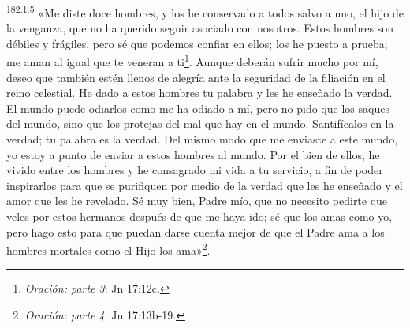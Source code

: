 \par 
\textsuperscript{182:1.5} «Me diste doce hombres, y los he conservado a todos salvo a uno, el hijo de la venganza, que no ha querido seguir asociado con nosotros. Estos hombres son débiles y frágiles, pero sé que podemos confiar en ellos; los he puesto a prueba; me aman al igual que te veneran a ti\footnote{\textit{Oración: parte 3}: Jn 17:12c.}. Aunque deberán sufrir mucho por mí, deseo que también estén llenos de alegría ante la seguridad de la filiación en el reino celestial. He dado a estos hombres tu palabra y les he enseñado la verdad. El mundo puede odiarlos como me ha odiado a mí, pero no pido que los saques del mundo, sino que los protejas del mal que hay en el mundo. Santifícalos en la verdad; tu palabra es la verdad. Del mismo modo que me enviaste a este mundo, yo estoy a punto de enviar a estos hombres al mundo. Por el bien de ellos, he vivido entre los hombres y he consagrado mi vida a tu servicio, a fin de poder inspirarlos para que se purifiquen por medio de la verdad que les he enseñado y el amor que les he revelado. Sé muy bien, Padre mío, que no necesito pedirte que veles por estos hermanos después de que me haya ido; sé que los amas como yo, pero hago esto para que puedan darse cuenta mejor de que el Padre ama a los hombres mortales como el Hijo los ama»\footnote{\textit{Oración: parte 4}: Jn 17:13b-19.}.

